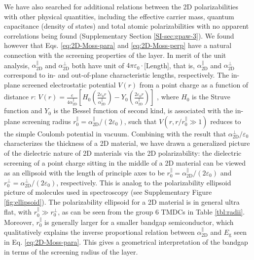 \documentclass[journal=ancac3,manuscript=article,email=true,hyperref=true,keywords=false]{achemso}
\begin{document}
We have also searched for additional relations between the 2D
polarizabilities with other physical quantities, including the
effective carrier mass, quantum capacitance (density of states) and
total atomic polarizabilities with no apparent correlations being
found (Supplementary Section \ref{SI-sec:gpaw-3}).  We found however that
Eqs. \ref{eq:2D-Moss-para} and \ref{eq:2D-Moss-perp} have a natural
connection with the screening properties of the layer.
%
In merit of the unit analysis,
$\alpha_{\mathrm{2D}}^{\parallel}$ and $\alpha_{\mathrm{2D}}^{\perp}$
both have unit of $4\pi\varepsilon_{0} \cdot$[Length], that is, $\alpha_{\mathrm{2D}}^{\parallel}$ and
$\alpha_{\mathrm{2D}}^{\perp}$ correspond to in- and out-of-plane
characteristic lengths, respectively. The in-plane screened
electrostatic potential $V(r)$ from a point charge as
a function of distance $r$: 
$V(r) = {\displaystyle \frac{e}{4 \alpha_{\mathrm{2D}}^{\parallel}}}
\left[H_{0}({\displaystyle \frac{2\varepsilon_{0}
      r}{\alpha_{\mathrm{2D}}^{\parallel}}}) - Y_{0}( {\displaystyle
    \frac{2
      \varepsilon_{0}r}{\alpha_{\mathrm{2D}}^{\parallel}}})\right]$
\cite{Keldysh_1979_eps_multi,Pulci_2014}, where $H_{0}$ is the Struve
function and $Y_{0}$ is the Bessel function of second kind, is
associated with the in-plane screening radius
$r_{0}^{\parallel}=\alpha_{\mathrm{2D}}^{\parallel}/(2
\varepsilon_{0})$, such that $V(r,r/r^{\parallel}_{0} \gg 1)$ reduces
to the simple Coulomb potential in vacuum. Combining with the result
that $\alpha_{\mathrm{2D}}^{\perp}/\varepsilon_{0}$ characterizes the
thickness of a 2D material, we have drawn a generalized picture of the
dielectric nature of 2D materials via the 2D polarizability: the
dielectric screening of a point charge sitting in the middle of a 2D
material can be viewed as an ellipsoid with the length of principle
axes to be
$r_{0}^{\parallel} = \alpha_{\mathrm{2D}}^{\parallel}/(2
\varepsilon_{0})$ and
$r_{0}^{\perp} = \alpha^{\perp}_{\mathrm{2D}}/(2 \varepsilon_{0})$,
respectively. This is analog to the polarizability ellipsoid picture of
molecules used in spectroscopy \cite{Banwell_1994} (see Supplementary
Figure \ref{fig:ellipsoid}). The polarizability ellipsoid for a 2D
material is in general ultra flat, with
$r_{0}^{\parallel} \gg r_{0}^{\perp}$, as can be seen from the group 6
TMDCs in Table \ref{tbl:radii}.  Moreover,
$r_{0}^{\parallel}$ is generally larger for a smaller bandgap
semiconductor, which qualitatively explains the inverse proportional
relation between $\alpha_{\mathrm{2D}}^{\parallel}$ and
$E_{\mathrm{g}}$ seen in Eq. \ref{eq:2D-Moss-para}. 
This gives a geometrical interpretation of the bandgap in terms 
of the screening radius of the layer. 
\end{document}
